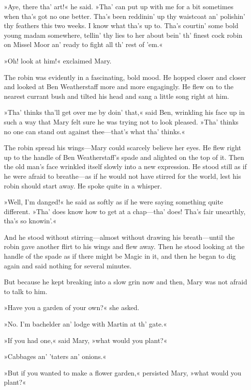 »Aye, there tha' art!« he said. »Tha' can put up with me for a bit sometimes when tha's got no one better. Tha's been reddinin' up thy waistcoat an' polishin' thy feathers this two weeks. I know what tha's up to. Tha's courtin' some bold young madam somewhere, tellin' thy lies to her about bein' th' finest cock robin on Missel Moor an' ready to fight all th' rest of 'em.«

»Oh! look at him!« exclaimed Mary.

The robin was evidently in a fascinating, bold mood. He hopped closer and closer and looked at Ben Weatherstaff more and more engagingly. He flew on to the nearest currant bush and tilted his head and sang a little song right at him.

»Tha' thinks tha'll get over me by doin' that,« said Ben, wrinkling his face up in such a way that Mary felt sure he was trying not to look pleased. »Tha' thinks no one can stand out against thee—that's what tha' thinks.«

The robin spread his wings—Mary could scarcely believe her eyes. He flew right up to the handle of Ben Weatherstaff's spade and alighted on the top of it. Then the old man's face wrinkled itself slowly into a new expression. He stood still as if he were afraid to breathe—as if he would not have stirred for the world, lest his robin should start away. He spoke quite in a whisper.

»Well, I'm danged!« he said as softly as if he were saying something quite different. »Tha' does know how to get at a chap—tha' does! Tha's fair unearthly, tha's so knowin'.«

And he stood without stirring—almost without drawing his breath—until the robin gave another flirt to his wings and flew away. Then he stood looking at the handle of the spade as if there might be Magic in it, and then he began to dig again and said nothing for several minutes.

But because he kept breaking into a slow grin now and then, Mary was not afraid to talk to him.

»Have you a garden of your own?« she asked.

»No. I'm bachelder an' lodge with Martin at th' gate.«

»If you had one,« said Mary, »what would you plant?«

»Cabbages an' 'taters an' onions.«

»But if you wanted to make a flower garden,« persisted Mary, »what would you plant?«

